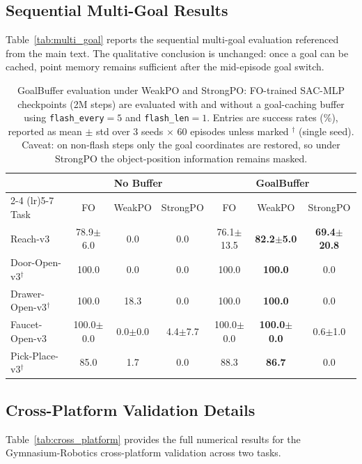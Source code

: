 \subsection{Sequential Multi-Goal Results}

Table~\ref{tab:multi_goal} reports the sequential multi-goal evaluation referenced from the main text. The qualitative conclusion is unchanged: once a goal can be cached, point memory remains sufficient after the mid-episode goal switch.



\begin{table}[t]
\centering
\caption{GoalBuffer evaluation under WeakPO and StrongPO: FO-trained SAC-MLP checkpoints (2M steps) are evaluated with and without a goal-caching buffer using \texttt{flash\_every}$=5$ and \texttt{flash\_len}$=1$. Entries are success rates (\%), reported as mean $\pm$ std over 3 seeds $\times$ 60 episodes unless marked $^\dagger$ (single seed). Caveat: on non-flash steps only the goal coordinates are restored, so under StrongPO the object-position information remains masked.}
\label{tab:goal_buffer}
\begin{tabular}{l ccc ccc}
\toprule
& \multicolumn{3}{c}{No Buffer} & \multicolumn{3}{c}{GoalBuffer} \\
\cmidrule(lr){2-4} \cmidrule(lr){5-7}
Task & FO & WeakPO & StrongPO & FO & WeakPO & StrongPO \\
\midrule
Reach-v3 & 78.9$\pm$6.0 & 0.0 & 0.0 & 76.1$\pm$13.5 & \textbf{82.2$\pm$5.0} & \textbf{69.4$\pm$20.8} \\
Door-Open-v3$^\dagger$ & 100.0 & 0.0 & 0.0 & 100.0 & \textbf{100.0} & 0.0 \\
Drawer-Open-v3$^\dagger$ & 100.0 & 18.3 & 0.0 & 100.0 & \textbf{100.0} & 0.0 \\
Faucet-Open-v3 & 100.0$\pm$0.0 & 0.0$\pm$0.0 & 4.4$\pm$7.7 & 100.0$\pm$0.0 & \textbf{100.0$\pm$0.0} & 0.6$\pm$1.0 \\
Pick-Place-v3$^\dagger$ & 85.0 & 1.7 & 0.0 & 88.3 & \textbf{86.7} & 0.0 \\
\bottomrule
\end{tabular}
\end{table}

\subsection{Cross-Platform Validation Details}

Table~\ref{tab:cross_platform} provides the full numerical results for the Gymnasium-Robotics cross-platform validation across two tasks.

